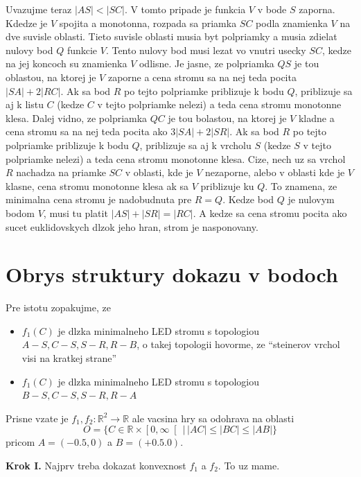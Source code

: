 \documentclass[12pt]{book}
\begin{document}
Uvazujme teraz $|AS|<|SC|$.
V tomto pripade je funkcia $V$ v bode $S$ zaporna.
Kdedze je $V$ spojita a monotonna, rozpada sa priamka $SC$ podla znamienka $V$
    na dve suvisle oblasti.
Tieto suvisle oblasti musia byt polpriamky a musia zdielat nulovy bod $Q$
    funkcie $V$.
Tento nulovy bod musi lezat vo vnutri usecky $SC$, kedze na jej koncoch su
    znamienka $V$ odlisne.
Je jasne, ze polpriamka $QS$ je tou oblastou, na ktorej je $V$ zaporne a
    cena stromu sa na nej teda pocita $|SA|+2|RC|$.
Ak sa bod $R$ po tejto polpriamke priblizuje k bodu $Q$, priblizuje sa aj k
    listu $C$ (kedze $C$ v tejto polpriamke nelezi) a teda cena stromu
    monotonne klesa.
Dalej vidno, ze polpriamka $QC$ je tou bolastou, na ktorej je $V$ kladne a cena
    stromu sa na nej teda pocita ako $3|SA|+2|SR|$.
Ak sa bod $R$ po tejto polpriamke priblizuje k bodu $Q$, priblizuje sa aj k
    vrcholu $S$ (kedze $S$ v tejto polpriamke nelezi) a teda cena stromu
    monotonne klesa.
Cize, nech uz sa vrchol $R$ nachadza na priamke $SC$ v oblasti, kde je $V$
    nezaporne, alebo v oblasti kde je $V$ klasne, cena stromu monotonne klesa
    ak sa $V$ priblizuje ku $Q$.
To znamena, ze minimalna cena stromu je nadobudnuta pre $R=Q$.
Kedze bod $Q$ je nulovym bodom $V$, musi tu platit $|AS|+|SR|=|RC|$.
A kedze sa cena stromu pocita ako sucet euklidovskych dlzok jeho hran, strom
    je nasponovany.

\section{Obrys struktury dokazu v bodoch}

Pre istotu zopakujme, ze 
    \begin{itemize}
        \item $f_{1}(C)$ je dlzka minimalneho LED stromu s topologiou
            $A-S,C-S,S-R,R-B$, o takej topologii hovorme, ze ``steinerov
            vrchol visi na kratkej strane''
        \item $f_{1}(C)$ je dlzka minimalneho LED stromu s topologiou
            $B-S,C-S,S-R,R-A$
    \end{itemize}
Prisne vzate je $f_{1},f_{2}\colon\mathbb{R}^{2}\to\mathbb{R}$ ale vacsina
    hry sa odohrava na oblasti
    \begin{equation*}
        O
        =
        \{C\in\mathbb{R}\times\left[0,\infty\right[\,|\,|AC|\le|BC|\le|AB|\}
    \end{equation*}
    pricom $A=(-0.5,0)$ a $B=(+0.5.0)$.

{\bf Krok I.}
Najprv treba dokazat konvexnost $f_{1}$ a $f_{2}$.
To uz mame.
\end{document}
